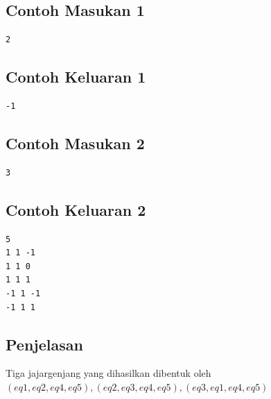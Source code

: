 \documentclass{article}
\begin{document}
\begin{multicols}{2}
\subsection*{Contoh Masukan 1}
\begin{lstlisting}
2

\end{lstlisting}
\columnbreak
\subsection*{Contoh Keluaran 1}
\begin{lstlisting}
-1

\end{lstlisting}
\vfill
\end{multicols}

\begin{multicols}{2}
\subsection*{Contoh Masukan 2}
\begin{lstlisting}
3
\end{lstlisting}
\null
\null
\null
\null
\null
\null
\null
\null
\columnbreak
\subsection*{Contoh Keluaran 2}
\begin{lstlisting}
5
1 1 -1
1 1 0
1 1 1
-1 1 -1
-1 1 1
\end{lstlisting}
\vfill
\null
\end{multicols}

\subsection*{Penjelasan}
\begin{center}
\end{center}
Tiga jajargenjang yang dihasilkan dibentuk oleh $(eq1, eq2, eq4, eq5), (eq2, eq3, eq4, eq5), (eq3, eq1, eq4, eq5)$
\end{document}
